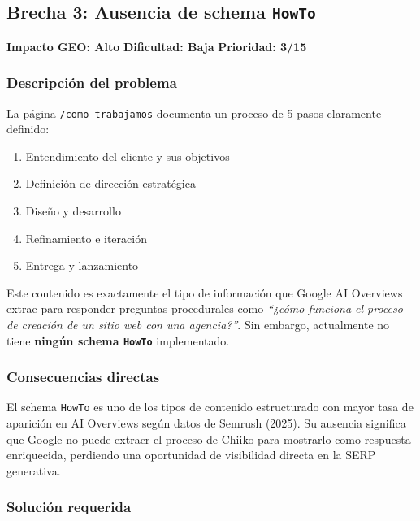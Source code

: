 \documentclass[12pt, a4paper]{article}
\begin{document}
\subsection{Brecha 3: Ausencia de schema \texttt{HowTo}}

\begin{highbox}
\textbf{Impacto GEO: Alto} \quad \textbf{Dificultad: Baja} \quad \textbf{Prioridad: 3/15}
\end{highbox}

\subsubsection{Descripción del problema}

La página \texttt{/como-trabajamos} documenta un proceso de 5 pasos claramente definido:
\begin{enumerate}
  \item Entendimiento del cliente y sus objetivos
  \item Definición de dirección estratégica
  \item Diseño y desarrollo
  \item Refinamiento e iteración
  \item Entrega y lanzamiento
\end{enumerate}

Este contenido es exactamente el tipo de información que Google AI Overviews extrae para responder preguntas procedurales como \textit{``¿cómo funciona el proceso de creación de un sitio web con una agencia?''}. Sin embargo, actualmente no tiene \textbf{ningún schema \texttt{HowTo}} implementado.

\subsubsection{Consecuencias directas}

El schema \texttt{HowTo} es uno de los tipos de contenido estructurado con mayor tasa de aparición en AI Overviews según datos de Semrush (2025). Su ausencia significa que Google no puede extraer el proceso de Chiiko para mostrarlo como respuesta enriquecida, perdiendo una oportunidad de visibilidad directa en la SERP generativa.

\subsubsection{Solución requerida}
\end{document}
